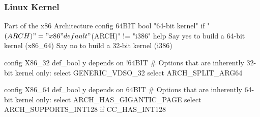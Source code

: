 \subsubsection*{Linux Kernel}

\begin{frame}[fragile]{\myframetitle}
	\begin{mycolumns}
		\begin{kconfigtight}[basicstyle=\small]{Part of the x86 Architecture }
config 64BIT
	bool "64-bit kernel" if "$(ARCH)" = "x86"
	default "$(ARCH)" != "i386"
	help
		Say yes to build a 64-bit kernel (x86_64)
		Say no to build a 32-bit kernel (i386)

config X86_32
	def_bool y
	depends on !64BIT
	# Options that are inherently 32-bit kernel only:
	select GENERIC_VDSO_32
	select ARCH_SPLIT_ARG64

config X86_64
	def_bool y
	depends on 64BIT
	# Options that are inherently 64-bit kernel only:
	select ARCH_HAS_GIGANTIC_PAGE
	select ARCH_SUPPORTS_INT128 if CC_HAS_INT128
\end{kconfigtight}
	\mynextcolumn
		\hspace*{-0.07253886\linewidth}%
	\end{mycolumns}
\end{frame}